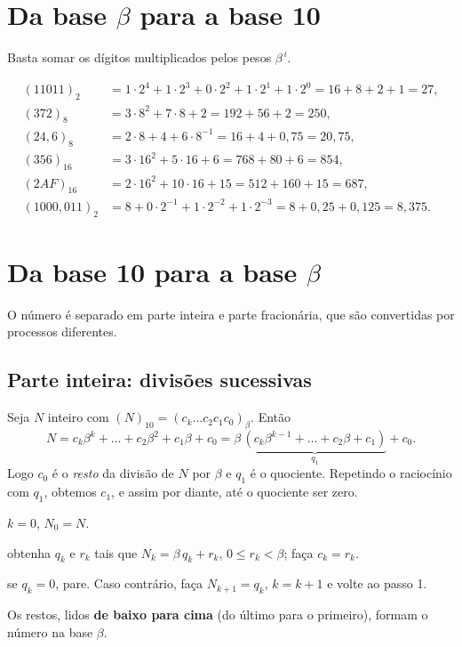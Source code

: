 \section{Da base \texorpdfstring{$\beta$}{beta} para a base 10}

Basta somar os dígitos multiplicados pelos pesos $\beta^{\,i}$.

\begin{exemplo}
\begin{align*}
(11011)_2  &=1\cdot2^4+1\cdot2^3+0\cdot2^2+1\cdot2^1+1\cdot2^0=16+8+2+1=27,\\
(372)_8    &=3\cdot8^2+7\cdot8+2=192+56+2=250,\\
(24{,}6)_8 &=2\cdot8+4+6\cdot8^{-1}=16+4+0{,}75=20{,}75,\\
(356)_{16} &=3\cdot16^2+5\cdot16+6=768+80+6=854,\\
(2AF)_{16} &=2\cdot16^2+10\cdot16+15=512+160+15=687,\\
(1000{,}011)_2&=8+0\cdot2^{-1}+1\cdot2^{-2}+1\cdot2^{-3}=8+0{,}25+0{,}125=8{,}375.
\end{align*}
\end{exemplo}

\section{Da base 10 para a base \texorpdfstring{$\beta$}{beta}}

O número é separado em parte inteira e parte fracionária, que são convertidas por processos
diferentes.

\subsection{Parte inteira: divisões sucessivas}

Seja $N$ inteiro com $(N)_{10}=(c_k\dots c_2c_1c_0)_\beta$. Então
\[
N=c_k\beta^k+\dots+c_2\beta^2+c_1\beta+c_0=\beta\,\underbrace{(c_k\beta^{k-1}+\dots+c_2\beta+c_1)}_{q_1}+c_0 .
\]
Logo $c_0$ é o \emph{resto} da divisão de $N$ por $\beta$ e $q_1$ é o quociente. Repetindo
o raciocínio com $q_1$, obtemos $c_1$, e assim por diante, até o quociente ser zero.

\begin{tcolorbox}[colback=azul!3,colframe=azul!60,title={Algoritmo: inteiro decimal $\to$ base $\beta$},fonttitle=\bfseries]
\begin{description}[nosep,font=\normalfont\bfseries]
  \item[Passo 0:] $k=0$, $N_0=N$.
  \item[Passo 1:] obtenha $q_k$ e $r_k$ tais que $N_k=\beta\,q_k+r_k$, $0\le r_k<\beta$; faça $c_k=r_k$.
  \item[Passo 2:] se $q_k=0$, pare. Caso contrário, faça $N_{k+1}=q_k$, $k=k+1$ e volte ao passo 1.
\end{description}
Os restos, lidos \textbf{de baixo para cima} (do último para o primeiro), formam o número na base $\beta$.
\end{tcolorbox}

